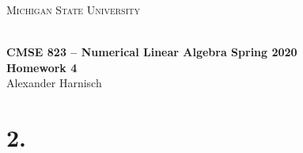 \documentclass[a4paper, 11pt]{article}
\begin{document}
\noindent
\centerline{\small{\textsc{Michigan State University}}} \\
\large{\textbf{CMSE 823 – Numerical Linear Algebra \hfill Spring 2020 \\
Homework 4}} \\
Alexander Harnisch \\
\noindent\makebox[\linewidth]{\rule{\textwidth}{0.4pt}}

\section*{2.}
\end{document}
